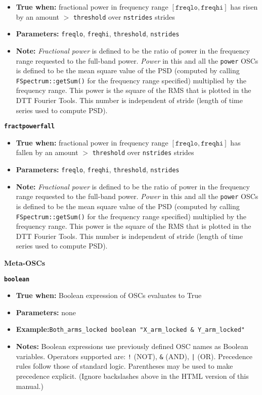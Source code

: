 {\begin{itemize}
\item \textbf{True when:} fractional power in frequency range
  $[\mathtt{freqlo}, \mathtt{freqhi}]$ has risen by an amount $>$
  \texttt{threshold} over \texttt{nstrides} strides
\item \textbf{Parameters:} \texttt{freqlo}, \texttt{freqhi},
  \texttt{threshold}, \texttt{nstrides}
\item \textbf{Note:} \textit{Fractional power} is defined to be the
  ratio of power in the frequency range requested to the full-band
  power.  \textit{Power} in this and all the \texttt{power}
  OSCs is defined to be the mean square value of the PSD
  (computed by calling \texttt{FSpectrum::getSum()} for the
  frequency range specified) multiplied by the frequency range.  This
  power is the square of the RMS that is plotted in the DTT Fourier
  Tools. This number is independent of stride (length of time series
  used to compute PSD). 
\end{itemize}

{\large\texttt{\textbf{fractpowerfall}}}

\begin{itemize}
\item \textbf{True when:} fractional power in frequency range
  $[\mathtt{freqlo}, \mathtt{freqhi}]$ has fallen by an amount $>$
  \texttt{threshold} over \texttt{nstrides} strides
\item \textbf{Parameters:} \texttt{freqlo}, \texttt{freqhi},
  \texttt{threshold}, \texttt{nstrides}
\item \textbf{Note:} \textit{Fractional power} is defined to be the
  ratio of power in the frequency range requested to the full-band
  power.  \textit{Power} in this and all the \texttt{power}
  OSCs is defined to be the mean square value of the PSD
 (computed by calling \texttt{FSpectrum::getSum()} for the
  frequency range specified) multiplied by the frequency range.  This
  power is the square of the RMS that is plotted in the DTT Fourier
  Tools. This number is independent of stride (length of time series
  used to compute PSD). 
\end{itemize}

\begin{center}
  \textbf{Meta-OSCs}
\end{center}

{\large\texttt{\textbf{boolean}}}

\begin{itemize}
\item \textbf{True when:} Boolean expression of OSCs evaluates to True
\item \textbf{Parameters:} none
\item \textbf{Example:}\texttt{Both\_arms\_locked  boolean "X\_arm\_locked
    \& Y\_arm\_locked"}
\item \textbf{Notes:} Boolean expressions use previously defined OSC
  names as Boolean variables.  Operators supported are: \texttt{!}
  (NOT), \texttt{\&} (AND), \texttt{|} (OR).  Precedence rules follow
  those of standard logic. Parentheses may be used to make precedence
  explicit. (Ignore backslashes above in the HTML version of this
  manual.)
\end{itemize}

}
